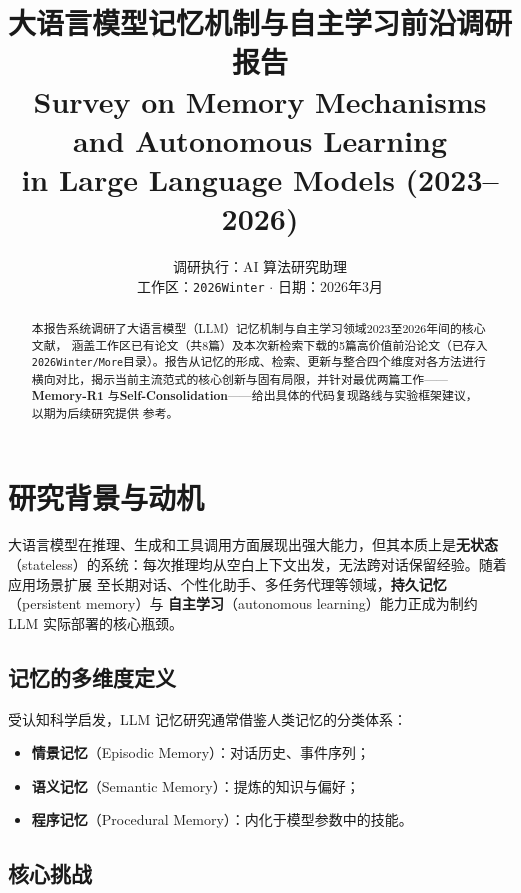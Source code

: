 \documentclass[11pt,a4paper]{article}
\title{
  \vspace{-1cm}
  \LARGE\bfseries 大语言模型记忆机制与自主学习前沿调研报告\\[0.5em]
  \large Survey on Memory Mechanisms and Autonomous Learning\\
  in Large Language Models (2023--2026)
}
\author{调研执行：AI 算法研究助理\\[0.3em]
  \small 工作区：\texttt{2026Winter} $\cdot$ 日期：2026年3月}
\date{}
\begin{document}
\maketitle
\thispagestyle{empty}

\begin{abstract}
本报告系统调研了大语言模型（LLM）记忆机制与自主学习领域2023至2026年间的核心文献，
涵盖工作区已有论文（共8篇）及本次新检索下载的5篇高价值前沿论文（已存入
\texttt{2026Winter/More}目录）。报告从记忆的形成、检索、更新与整合四个维度对各方法进行
横向对比，揭示当前主流范式的核心创新与固有局限，并针对最优两篇工作——\textbf{Memory-R1}
与\textbf{Self-Consolidation}——给出具体的代码复现路线与实验框架建议，以期为后续研究提供
参考。
\end{abstract}

\tableofcontents
\newpage

\section{研究背景与动机}

大语言模型在推理、生成和工具调用方面展现出强大能力，但其本质上是\textbf{无状态}
（stateless）的系统：每次推理均从空白上下文出发，无法跨对话保留经验。随着应用场景扩展
至长期对话、个性化助手、多任务代理等领域，\textbf{持久记忆}（persistent memory）与
\textbf{自主学习}（autonomous learning）能力正成为制约 LLM 实际部署的核心瓶颈。

\subsection{记忆的多维度定义}

受认知科学启发，LLM 记忆研究通常借鉴人类记忆的分类体系：

\begin{itemize}
  \item \textbf{情景记忆}（Episodic Memory）：对话历史、事件序列；
  \item \textbf{语义记忆}（Semantic Memory）：提炼的知识与偏好；
  \item \textbf{程序记忆}（Procedural Memory）：内化于模型参数中的技能。
\end{itemize}

\subsection{核心挑战}
\end{document}
